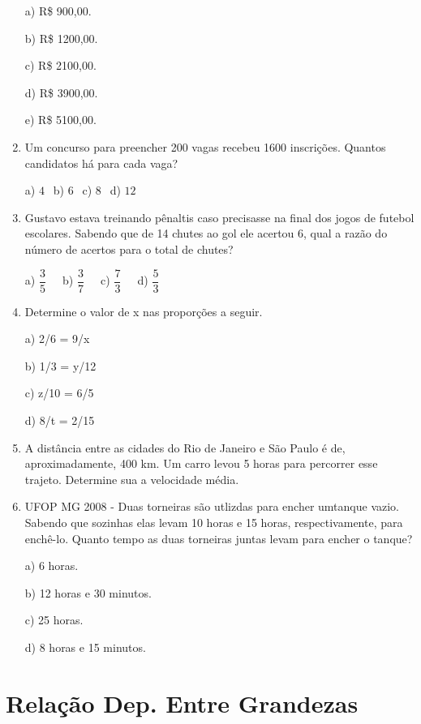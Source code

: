 \begin{multicols*}{2}
\begin{enumerate}
a) R\$ 900,00.

b) R\$ 1200,00.

c) R\$ 2100,00.

d) R\$ 3900,00.

e) R\$ 5100,00.\\

		\item Um concurso para preencher 200 vagas recebeu 1600 inscrições. Quantos candidatos há para cada vaga?

	a) $4 \ \ $ b) $6 \ \ $ c) $8 \ \ $ d) $12 \ \ $

		\item Gustavo estava treinando pênaltis caso precisasse na final dos jogos de futebol escolares. Sabendo que de 14 chutes ao gol ele acertou 6, qual a razão do número de acertos para o total de chutes?

	a) $\dfrac{3}{5} \ \ \ \ \ $ b) $\dfrac{3}{7} \ \ \ \ \ $ c) $\dfrac{7}{3} \ \ \ \ \ $ d) $\dfrac{5}{3} $

		\item Determine o valor de x nas proporções a seguir.

a) 2/6 = 9/x

b) 1/3 = y/12

c) z/10 = 6/5

d) 8/t = 2/15\\

		\item A distância entre as cidades do Rio de Janeiro e São Paulo é de, aproximadamente, 400 km. Um carro levou 5 horas para percorrer esse trajeto. Determine sua a velocidade média.\\
		
		\item UFOP MG 2008 - Duas torneiras são utlizdas para encher umtanque vazio. Sabendo que sozinhas elas levam 10 horas e 15 horas, respectivamente, para enchê-lo. Quanto tempo as duas torneiras juntas levam para encher o tanque?
		
a)	6 horas.

b) 12 horas e 30 minutos.

c) 25 horas.

d) 8 horas e 15 minutos.\\
		
		\end{enumerate}
		
\section{Relação Dep. Entre Grandezas}


\end{multicols*}
